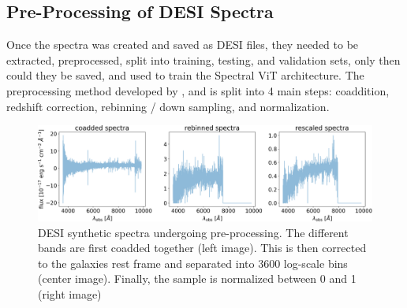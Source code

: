 \subsection{Pre-Processing of DESI Spectra}
\label{ssec:preprocess}
Once the spectra was created and saved as DESI files, they needed to be 
extracted, preprocessed, split into training, testing, and validation sets, 
only then could they be saved, and used to train the Spectral ViT architecture.
The preprocessing method developed by \textcite{wasserman2021, Sepeku2022}, and is split into 
4 main steps: coaddition, redshift correction, rebinning / down sampling, and normalization. 

\begin{figure}[t]
    \centering
    \includegraphics[width=\textwidth]{figures/preprocess/3600_Zcorrected_spectra.png}
    \caption[Spectra Pre-Processing --  Redshift Corrected]{DESI synthetic spectra undergoing pre-processing. The different bands
    are first coadded together (left image). This is then  corrected to the galaxies rest frame and separated into 3600 
    log-scale bins (center image). Finally, the sample is normalized between 0 and 1 (right image)}
    \label{fig:spectra_preproc}
\end{figure} 


